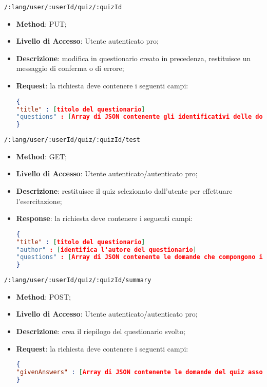 	\item \texttt{/:lang/user/:userId/quiz/:quizId}
	\begin{itemize}
		\item \textbf{Method}: PUT;
		\item \textbf{Livello di Accesso}: Utente autenticato pro;
		\item \textbf{Descrizione}: modifica in questionario creato in precedenza, restituisce un messaggio di conferma o di errore;
		\item \textbf{Request}: la richiesta deve contenere i seguenti campi:
\begin{lstlisting}[language=json,firstnumber=1]
{
"title" : [titolo del questionario]
"questions" : [Array di JSON contenente gli identificativi delle domande che compongono il questionario]
}
\end{lstlisting}
	\end{itemize}
	
	\item \texttt{/:lang/user/:userId/quiz/:quizId/test}
	\begin{itemize}
		\item \textbf{Method}: GET;
		\item \textbf{Livello di Accesso}: Utente autenticato/autenticato pro;
		\item \textbf{Descrizione}: restituisce il quiz selezionato dall'utente per effettuare l'esercitazione;
		\item \textbf{Response}: la richiesta deve contenere i seguenti campi:
\begin{lstlisting}[language=json,firstnumber=1]
{
"title" : [titolo del questionario]
"author" : [identifica l'autore del questionario]
"questions" : [Array di JSON contenente le domande che compongono il questionario]
}
\end{lstlisting}
	\end{itemize}
	
	
	\item \texttt{/:lang/user/:userId/quiz/:quizId/summary}
	\begin{itemize}
		\item \textbf{Method}: POST;
		\item \textbf{Livello di Accesso}: Utente autenticato/autenticato pro;
		\item \textbf{Descrizione}: crea il riepilogo del questionario svolto;
		\item \textbf{Request}: la richiesta deve contenere i seguenti campi:
\begin{lstlisting}[language=json,firstnumber=1]
{
"givenAnswers" : [Array di JSON contenente le domande del quiz associate alle risposte date dall'utente]
}
\end{lstlisting}
	\end{itemize}